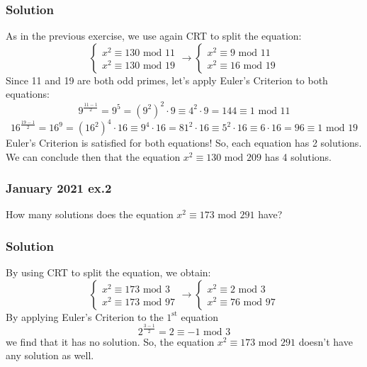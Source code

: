 \documentclass[11pt, a4paper]{article}
\newcommand{\mymod}{
    \text{ mod }
}
\begin{document}
\subsubsection*{Solution}
As in the previous exercise, we use again CRT to split the equation:
\begin{equation*}
    \begin{cases}
        x^2\equiv130\mymod11\\
        x^2\equiv130\mymod19
    \end{cases}\longrightarrow
    \begin{cases}
        x^2\equiv9\mymod11\\
        x^2\equiv16\mymod19
    \end{cases}
\end{equation*}
Since 11 and 19 are both odd primes, let's apply Euler's Criterion to both equations:
$$9^{\tfrac{11-1}{2}}=9^5=\left(9^2\right)^2\cdot9\equiv4^2\cdot9=144\equiv1\mymod11$$
$$16^{\tfrac{19-1}{2}}=16^9=\left(16^2\right)^4\cdot16\equiv9^4\cdot16=81^2\cdot16\equiv5^2\cdot16\equiv6\cdot16=96\equiv1\mymod19$$
Euler's Criterion is satisfied for both equations! So, each equation has 2 solutions. We can conclude then that the equation $x^2\equiv130\mymod209$ has 4 solutions.

\subsubsection{January 2021 ex.2}
How many solutions does the equation $x^2\equiv173\mymod291$ have?
\subsubsection*{Solution}
By using CRT to split the equation, we obtain:
\begin{equation*}
    \begin{cases}
        x^2\equiv173\mymod3\\
        x^2\equiv173\mymod97
    \end{cases}\longrightarrow
    \begin{cases}
        x^2\equiv2\mymod3\\
        x^2\equiv76\mymod97
    \end{cases}
\end{equation*}
By applying Euler's Criterion to the $1^{\text{st}}$ equation
$$2^{\tfrac{3-1}{2}}=2\equiv-1\mymod3$$
we find that it has no solution. So, the equation $x^2\equiv173\mymod291$ doesn't have any solution as well.
\end{document}
